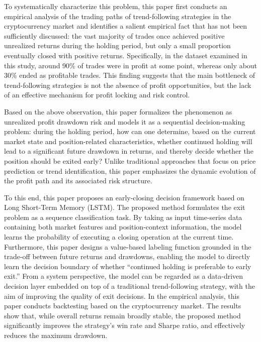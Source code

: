 \documentclass[12pt]{article}
\begin{document}
To systematically characterize this problem, this paper first conducts an empirical analysis 
of the trading paths of trend-following strategies in the cryptocurrency market and identifies 
a salient empirical fact that has not been sufficiently discussed: the vast majority of trades 
once achieved positive unrealized returns during the holding period, but only a small proportion 
eventually closed with positive returns. Specifically, in the dataset examined in this study, 
around 90\% of trades were in profit at some point, whereas only about 30\% ended as profitable 
trades. This finding suggests that the main bottleneck of trend-following strategies is not the 
absence of profit opportunities, but the lack of an effective mechanism for profit locking and 
risk control.

Based on the above observation, this paper formalizes the phenomenon as unrealized profit 
drawdown risk and models it as a sequential decision-making problem: during the holding period, 
how can one determine, based on the current market state and position-related characteristics, 
whether continued holding will lead to a significant future drawdown in returns, and thereby 
decide whether the position should be exited early? Unlike traditional approaches that focus 
on price prediction or trend identification, this paper emphasizes the dynamic evolution of 
the profit path and its associated risk structure.

To this end, this paper proposes an early-closing decision framework based on Long Short-Term 
Memory (LSTM). The proposed method formulates the exit problem as a sequence classification 
task. By taking as input time-series data containing both market features and position-context 
information, the model learns the probability of executing a closing operation at the current 
time. Furthermore, this paper designs a value-based labeling function grounded in the 
trade-off between future returns and drawdowns, enabling the model to directly learn the 
decision boundary of whether ``continued holding is preferable to early exit.'' From a system 
perspective, the model can be regarded as a data-driven decision layer embedded on top of a 
traditional trend-following strategy, with the aim of improving the quality of exit decisions. 
In the empirical analysis, this paper conducts backtesting based on the cryptocurrency market. 
The results show that, while overall returns remain broadly stable, the proposed method 
significantly improves the strategy's win rate and Sharpe ratio, and effectively reduces the 
maximum drawdown.
\end{document}

